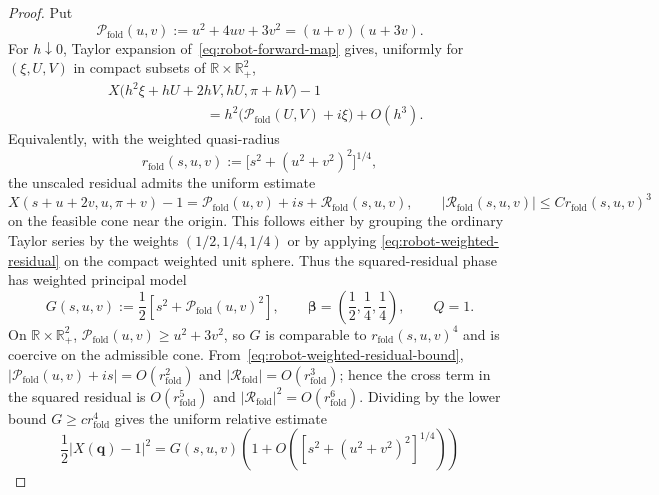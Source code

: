 \documentclass[11pt]{amsart}
\numberwithin{equation}{section}
\theoremstyle{definition}
\theoremstyle{remark}
\newcommand{\R}{\mathbb{R}}
\begin{document}
\begin{proof}
Put
\begin{equation}\label{eq:robot-corner-quadratic}
 \mathcal P_{\mathrm{fold}}(u,v):=u^2+4uv+3v^2=(u+v)(u+3v).
\end{equation}
For $h\downarrow0$, Taylor expansion of~\eqref{eq:robot-forward-map} gives,
uniformly for $(\xi,U,V)$ in compact subsets of
$\R\times\R_+^2$,
\begin{equation}\label{eq:robot-weighted-residual}
 \begin{split}
 &X\bigl(h^2\xi+hU+2hV,hU,\pi+hV\bigr)-1\\
 &\hspace{7em}
 =h^2\bigl(\mathcal P_{\mathrm{fold}}(U,V)+i\xi\bigr)+O(h^3).
 \end{split}
\end{equation}
Equivalently, with the weighted quasi-radius
\[
 r_{\mathrm{fold}}(s,u,v):=\bigl[s^2+(u^2+v^2)^2\bigr]^{1/4},
\]
the unscaled residual admits the uniform estimate
\begin{equation}\label{eq:robot-weighted-residual-bound}
 X(s+u+2v,u,\pi+v)-1=\mathcal P_{\mathrm{fold}}(u,v)+is+\mathcal R_{\mathrm{fold}}(s,u,v),
 \qquad |\mathcal R_{\mathrm{fold}}(s,u,v)|\le C r_{\mathrm{fold}}(s,u,v)^3
\end{equation}
on the feasible cone near the origin.  This follows either by grouping the
ordinary Taylor series by the weights $(1/2,1/4,1/4)$ or by applying
\eqref{eq:robot-weighted-residual} on the compact weighted unit sphere.
Thus the squared-residual phase has weighted principal model
\begin{equation}\label{eq:robot-principal-model}
 G(s,u,v):=\frac12\left[s^2+\mathcal P_{\mathrm{fold}}(u,v)^2\right],
 \qquad
 \bm\beta=\left(\frac12,\frac14,\frac14\right),
 \qquad Q=1.
\end{equation}
On $\R\times\R_+^2$,
$\mathcal P_{\mathrm{fold}}(u,v)\ge u^2+3v^2$, so $G$ is comparable to $r_{\mathrm{fold}}(s,u,v)^4$ and is coercive
on the admissible cone.  From~\eqref{eq:robot-weighted-residual-bound},
$|\mathcal P_{\mathrm{fold}}(u,v)+is|=O(r_{\mathrm{fold}}^2)$ and $|\mathcal R_{\mathrm{fold}}|=O(r_{\mathrm{fold}}^3)$; hence the cross term in the squared
residual is $O(r_{\mathrm{fold}}^5)$ and $|\mathcal R_{\mathrm{fold}}|^2=O(r_{\mathrm{fold}}^6)$.  Dividing by the lower bound
$G\ge cr_{\mathrm{fold}}^4$ gives the uniform relative estimate
\begin{equation}\label{eq:robot-phase-relative-error}
 \frac12|X(\bm q)-1|^2
 =G(s,u,v)\left(1+O\left(
 [s^2+(u^2+v^2)^2]^{1/4}
 \right)\right)
\end{equation}

\end{proof}
\end{document}
